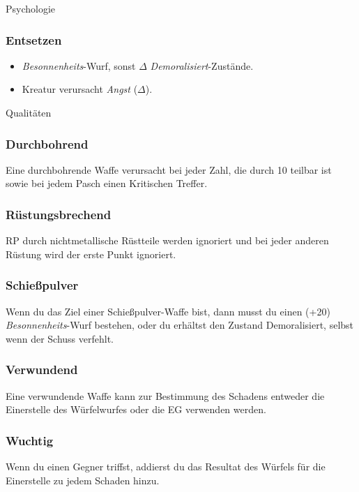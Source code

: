 \documentclass{article}
\begin{document}
\begin{multicols*}{3}
\begin{slsframe}{Psychologie}
        \subsubsection*{Entsetzen}
        \begin{itemize}
            \setlength\itemsep{0.1em}
            \item \textit{Besonnenheits}-Wurf, sonst $\Delta$ \textit{Demoralisiert}-Zustände. 
            \item Kreatur verursacht \textit{Angst} ($\Delta$).
        \end{itemize}

    \end{slsframe}

    \begin{slsframe}{Qualitäten}
        \subsubsection*{Durchbohrend}
        Eine durchbohrende Waffe verursacht bei jeder Zahl, die durch 10 teilbar ist sowie bei jedem Pasch einen Kritischen Treffer.

        \subsubsection*{Rüstungsbrechend}
        RP durch nichtmetallische Rüstteile werden ignoriert und bei jeder anderen Rüstung wird der erste Punkt ignoriert.

        \subsubsection*{Schießpulver}
        Wenn du das Ziel einer Schießpulver-Waffe bist, dann musst du einen (+20) \textit{Besonnenheits}-Wurf bestehen, oder du erhältst den Zustand Demoralisiert, selbst wenn der Schuss verfehlt.

        \subsubsection*{Verwundend}
        Eine verwundende Waffe kann zur Bestimmung des Schadens entweder die Einerstelle des Würfelwurfes oder die EG verwenden werden.
        
        \subsubsection*{Wuchtig}
        Wenn du einen Gegner triffst, addierst du das Resultat des Würfels für die Einerstelle zu jedem Schaden hinzu.


\end{slsframe}
\end{multicols*}
\end{document}
